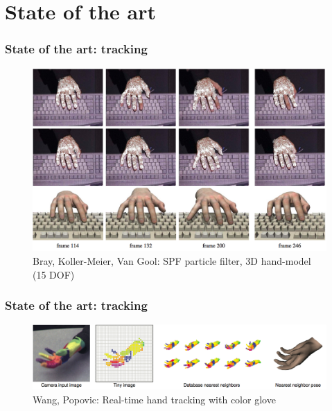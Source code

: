 \documentclass{beamer}
\begin{document}
	\section{State of the art}
	\begin{frame}
		\frametitle{State of the art: tracking}
		\begin{figure}
			\includegraphics[scale=0.2]{images/gool} 
			\caption{Bray, Koller-Meier, Van Gool: SPF particle filter, 3D hand-model (15 DOF)}
		\end{figure}
	\end{frame}
	\begin{frame}
		\frametitle{State of the art: tracking}
		\begin{figure}
			\includegraphics[scale=0.2]{images/wang} 
			\caption{Wang, Popovic: Real-time hand tracking with color glove }
		\end{figure}
	\end{frame}
\end{document}
